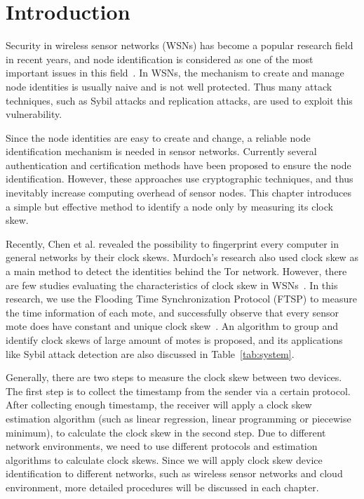 
\chapter{Introduction}
\label{cha:intro} 

Security in wireless sensor networks (WSNs) has become a popular research field in recent years, and node identification is considered as one of the most important issues in this field~\cite{MaddenFHH02}. In WSNs, the mechanism to create and manage node identities is usually naive and is not well protected. Thus many attack techniques, such as Sybil attacks and replication attacks, are used to exploit this vulnerability. 

	Since the node identities are easy to create and change, a reliable node identification mechanism is needed in sensor networks. Currently several authentication and certification methods have been proposed to ensure the node identification. However, these approaches use cryptographic techniques, and thus inevitably increase computing overhead of sensor nodes. This chapter introduces a simple but effective method to identify a node only by measuring its clock skew.

	Recently, Chen et al. revealed the possibility to fingerprint every computer in general networks by their clock skews. Murdoch's research also used clock skew as a main method to detect the identities behind the Tor network. However, there are few studies evaluating the characteristics of clock skew in WSNs~\cite{GarofalakisHM07}. In this research, we use the Flooding Time Synchronization Protocol (FTSP) to measure the time information of each mote, and successfully observe that every sensor mote does have constant and unique clock skew~\cite{KotiVDSD07, SubrPPKG06, ShengLMJ07, Wagner04}. An algorithm to group and identify clock skews of large amount of motes is proposed, and its applications like Sybil attack detection are also discussed in Table~\ref{tab:system}.
	
	Generally, there are two steps to measure the clock skew between two devices.
	The first step is to collect the timestamp from the sender via a certain protocol.
	After collecting enough timestamp, the receiver will apply a clock skew estimation algorithm (such as linear regression, linear programming or piecewise minimum), to calculate the clock skew in the second step.
	Due to different network environments, we need to use different protocols and estimation algorithms to calculate clock skews.
	Since we will apply clock skew device identification to different networks, such as wireless sensor networks and cloud environment, more detailed procedures will be discussed in each chapter.



